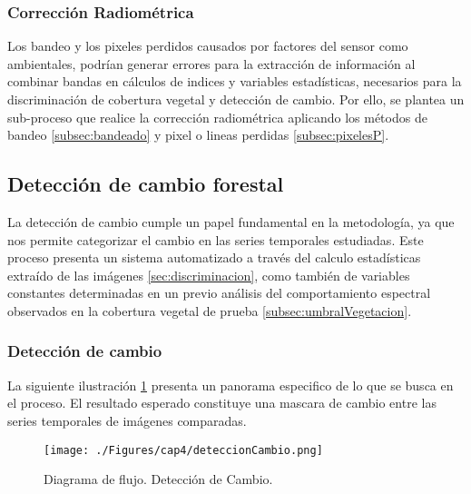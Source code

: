 \subsubsection{Correcci\'on Radiom\'etrica}
Los bandeo y los pixeles perdidos causados por factores del sensor como ambientales, podr\'ian generar errores para la extracci\'on de informaci\'on al combinar bandas en c\'alculos de indices y variables estad\'isticas, necesarios para la discriminaci\'on de cobertura vegetal y detecci\'on de cambio. Por ello, se plantea un sub-proceso que realice la correcci\'on radiom\'etrica aplicando los m\'etodos de bandeo \ref{subsec:bandeado} y pixel o lineas perdidas \ref{subsec:pixelesP}.

\subsection{Detecci\'on de cambio forestal}
La detecci\'on de cambio cumple un papel fundamental en la metodolog\'ia, ya que nos permite categorizar el cambio en las series temporales estudiadas. Este proceso presenta un sistema automatizado a trav\'es del calculo estad\'isticas extra\'ido de las im\'agenes \ref{sec:discriminacion}, como tambi\'en de variables constantes determinadas en un previo an\'alisis del comportamiento espectral observados en la cobertura vegetal de prueba \ref{subsec:umbralVegetacion}.

\subsubsection{Detecci\'on de cambio}
La siguiente ilustraci\'on \ref{fig:deteccionCambio} presenta un panorama especifico de lo que se busca en el proceso. El resultado esperado constituye una mascara de cambio entre las series temporales de im\'agenes comparadas.
\begin{figure}[H]
	\centering
	\texttt{[image: ./Figures/cap4/deteccionCambio.png]}
	\caption{Diagrama de flujo. Detecci\'on de Cambio.}
	\label{fig:deteccionCambio}
\end{figure}

